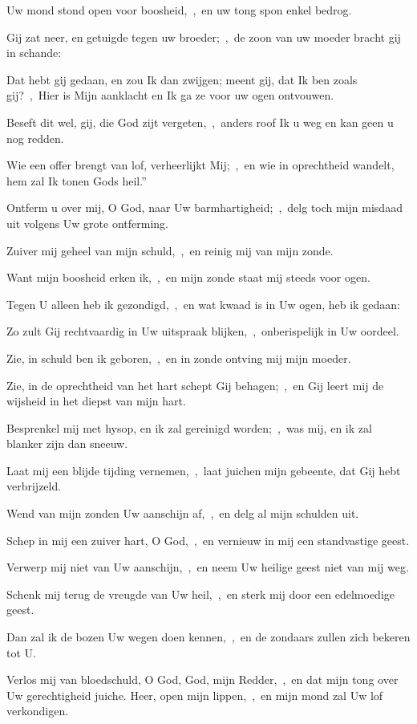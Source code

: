 \documentclass[12pt,twoside,a5paper]{article}
\begin{document}
\begin{halfparskip}
  Uw mond stond open voor boosheid,~\sep\ en uw tong spon enkel bedrog.

  Gij zat neer, en getuigde tegen uw broeder;~\sep\ de zoon van uw moeder bracht gij in schande:

  Dat hebt gij gedaan, en zou Ik dan zwijgen; meent gij, dat Ik ben zoals gij?~\sep\ Hier is Mijn aanklacht en Ik ga ze voor uw ogen ontvouwen.

  Beseft dit wel, gij, die God zijt vergeten,~\sep\ anders roof Ik u weg en kan geen u nog redden.

  Wie een offer brengt van lof, verheerlijkt Mij;~\sep\ en wie in oprechtheid wandelt, hem zal Ik tonen Gods heil.''

   Ontferm u over mij, O God, naar Uw barmhartigheid;~\sep\ delg toch mijn misdaad uit volgens Uw grote ontferming.

  Zuiver mij geheel van mijn schuld,~\sep\ en reinig mij van mijn zonde.

  Want mijn boosheid erken ik,~\sep\ en mijn zonde staat mij steeds voor ogen.

  Tegen U alleen heb ik gezondigd,~\sep\ en wat kwaad is in Uw ogen, heb ik gedaan:

  Zo zult Gij rechtvaardig in Uw uitspraak blijken,~\sep\ onberispelijk in Uw oordeel.

  Zie, in schuld ben ik geboren,~\sep\ en in zonde ontving mij mijn moeder.

  Zie, in de oprechtheid van het hart schept Gij behagen;~\sep\ en Gij leert mij de wijsheid in het diepst van mijn hart.

  Besprenkel mij met hysop, en ik zal gereinigd worden;~\sep\ was mij, en ik zal blanker zijn dan sneeuw.

  Laat mij een blijde tijding vernemen,~\sep\ laat juichen mijn gebeente, dat Gij hebt verbrijzeld.

  Wend van mijn zonden Uw aanschijn af,~\sep\ en delg al mijn schulden uit.

  Schep in mij een zuiver hart, O God,~\sep\ en vernieuw in mij een standvastige geest.

  Verwerp mij niet van Uw aanschijn,~\sep\ en neem Uw heilige geest niet van mij weg.

  Schenk mij terug de vreugde van Uw heil,~\sep\ en sterk mij door een edelmoedige geest.

  Dan zal ik de bozen Uw wegen doen kennen,~\sep\ en de zondaars zullen zich bekeren tot U.

  Verlos mij van bloedschuld, O God, God, mijn Redder,~\sep\ en dat mijn tong over Uw gerechtigheid juiche. Heer, open mijn lippen,~\sep\ en mijn mond zal Uw lof verkondigen.


\end{halfparskip}
\end{document}
